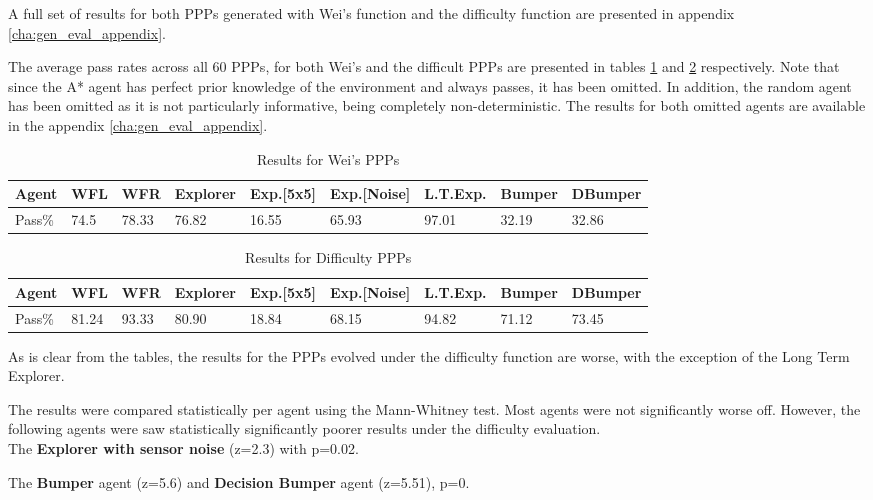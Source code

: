 \documentclass[authoryearcitations]{UoYCSproject}
\begin{document}
A full set of results for both PPPs generated with Wei's function and the difficulty function are presented in appendix \ref{cha:gen_eval_appendix}.

The average pass rates across all 60 PPPs, for both Wei's and the difficult PPPs are presented in tables \ref{table:wei_eval} and \ref{table:diff_eval} respectively. Note that since the A* agent has perfect prior knowledge of the environment and always passes, it has been omitted. In addition, the random agent has been omitted as it is not particularly informative, being completely non-deterministic. The results for both omitted agents are available in the appendix \ref{cha:gen_eval_appendix}.
\begin{table}
\begin{tabular}{|l|l|l|l|l|l|l|l|l|}
\hline
Agent&WFL&WFR&Explorer&Exp.[5x5]&Exp.[Noise]&L.T.Exp.&Bumper&DBumper\\
\hline
Pass\%&74.5&78.33&76.82&16.55&65.93&97.01&32.19&32.86\\
\hline
\end{tabular}
\caption{Results for Wei's PPPs}
\label{table:wei_eval}
\end{table}

\begin{table}
\begin{tabular}{|l|l|l|l|l|l|l|l|l|}
\hline
Agent&WFL&WFR&Explorer&Exp.[5x5]&Exp.[Noise]&L.T.Exp.&Bumper&DBumper\\
\hline

Pass\%&81.24&93.33&80.90&18.84&68.15&94.82&71.12&73.45\\
\hline
\end{tabular}
\caption{Results for Difficulty PPPs}
\label{table:diff_eval}
\end{table}

As is clear from the tables, the results for the PPPs evolved under the difficulty function are worse, with the exception of the Long Term Explorer.

The results were compared statistically per agent using the Mann-Whitney test. Most agents were not significantly worse off. However, the following agents were saw statistically significantly poorer results under the difficulty evaluation. \\

The \textbf{Explorer with sensor noise} (z=2.3) with p=0.02.

The \textbf{Bumper} agent (z=5.6) and \textbf{Decision Bumper} agent (z=5.51), p=0.
\end{document}
